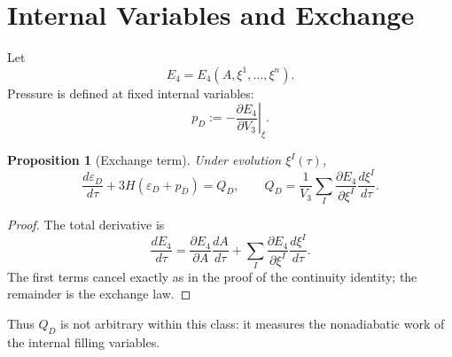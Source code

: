 \documentclass[11pt,a4paper]{article}
\def\dd{d}%
\numberwithin{equation}{section}
\newtheorem{proposition}[criterion]{Proposition}
\theoremstyle{remark}
\newcommand{\Efour}{E_4}
\newcommand{\epsD}{\varepsilon_D}
\newcommand{\pD}{p_D}
\newcommand{\QD}{Q_D}
\newcommand{\dd}{\mathrm{d}}
\begin{document}
\section{Internal Variables and Exchange}
Let
\begin{equation}
\Efour=\Efour(A,\xi^1,\ldots,\xi^n).
\end{equation}
Pressure is defined at fixed internal variables:
\begin{equation}
\pD:=-\left.\frac{\partial \Efour}{\partial V_3}\right|_{\xi}.
\end{equation}

\begin{proposition}[Exchange term]
Under evolution \(\xi^I(\tau)\),
\begin{equation}
\frac{\dd\epsD}{\dd\tau}+3H(\epsD+\pD)=\QD,
\qquad
\QD=\frac{1}{V_3}\sum_I\frac{\partial\Efour}{\partial\xi^I}\frac{\dd\xi^I}{\dd\tau}.
\end{equation}
\end{proposition}
\begin{proof}
The total derivative is
\begin{equation}
\frac{\dd\Efour}{\dd\tau}
=\frac{\partial\Efour}{\partial A}\frac{\dd A}{\dd\tau}
+\sum_I\frac{\partial\Efour}{\partial\xi^I}\frac{\dd\xi^I}{\dd\tau}.
\end{equation}
The first terms cancel exactly as in the proof of the continuity identity; the remainder is the exchange law.
\end{proof}

Thus \(\QD\) is not arbitrary within this class: it measures the nonadiabatic work of the internal filling variables.
\end{document}
